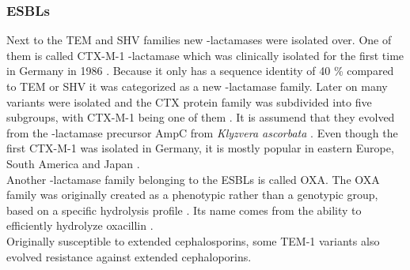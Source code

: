 \subsubsection{ESBLs }
Next to the TEM and SHV families new \textbeta-lactamases were isolated over. One of them is called CTX-M-1 \textbeta-lactamase which was clinically isolated for the first time in Germany in 1986 \cite{bradford_extended-spectrum_2001}. Because it only has a sequence identity of 40 \% compared to TEM or SHV \cite{bradford_extended-spectrum_2001} it was categorized as a new \textbeta-lactamase family. Later on many variants were isolated and the CTX protein family was subdivided into five subgroups, with CTX-M-1 being one of them  \cite{fernandes_-lactams:_2013}.
It is assumend that they evolved from the \textbeta-lactamase precursor AmpC from \textit{Klyzvera ascorbata}  \cite{bradford_extended-spectrum_2001}. Even though the first CTX-M-1 was isolated in Germany, it is mostly popular in eastern Europe, South America and Japan \cite{bradford_extended-spectrum_2001}. \\
Another \textbeta-lactamase family belonging to the ESBLs is called OXA.
The OXA family was originally created as a phenotypic rather than a genotypic group, based on a specific hydrolysis profile \cite{bradford_extended-spectrum_2001}. Its name comes from the ability to efficiently hydrolyze oxacillin \cite{bradford_extended-spectrum_2001}. \\
Originally susceptible to extended cephalosporins, some TEM-1 variants also evolved resistance against extended cephaloporins. 

